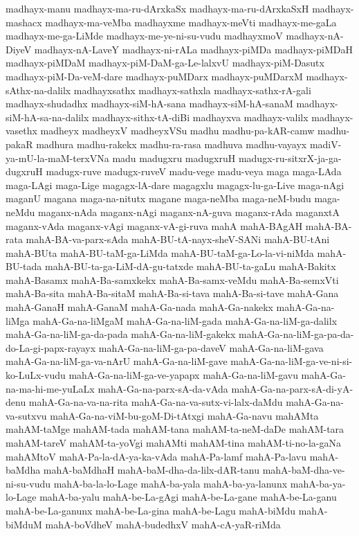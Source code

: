 {madhayx-manu
madhayx-ma-ru-dArxkaSx
madhayx-ma-ru-dArxkaSxH
madhayx-mashacx
madhayx-ma-veMba
madhayxme
madhayx-meVti
madhayx-me-gaLa
madhayx-me-ga-LiMde
madhayx-me-ye-ni-su-vudu
madhayxmoV
madhayx-nA-DiyeV
madhayx-nA-LaveY
madhayx-ni-rALa
madhayx-piMDa
madhayx-piMDaH
madhayx-piMDaM
madhayx-piM-DaM-ga-Le-lalxvU
madhayx-piM-Dasutx
madhayx-piM-Da-veM-dare
madhayx-puMDarx
madhayx-puMDarxM
madhayx-sAthx-na-dalilx
madhayxsathx
madhayx-sathxla
madhayx-sathx-rA-gali
madhayx-shudadhx
madhayx-siM-hA-sana
madhayx-siM-hA-sanaM
madhayx-siM-hA-sa-na-dalilx
madhayx-sithx-tA-diBi
madhayxva
madhayx-valilx
madhayx-vasethx
madheyx
madheyxV
madheyxVSu
madhu
madhu-pa-kAR-camw
madhu-pakaR
madhura
madhu-rakekx
madhu-ra-rasa
madhuva
madhu-vayayx
madiV-ya-mU-la-maM-terxVNa
madu
madugxru
madugxruH
madugx-ru-sitxrX-ja-ga-dugxruH
madugx-ruve
madugx-ruveV
madu-vege
madu-veya
maga
maga-LAda
maga-LAgi
maga-Lige
magagx-lA-dare
magagxlu
magagx-lu-ga-Live
maga-nAgi
maganU
magana
maga-na-nitutx
magane
maga-neMba
maga-neM-budu
maga-neMdu
maganx-nAda
maganx-nAgi
maganx-nA-guva
maganx-rAda
maganxtA
maganx-vAda
maganx-vAgi
maganx-vA-gi-ruva
mahA
mahA-BAgAH
mahA-BA-rata
mahA-BA-va-parx-sAda
mahA-BU-tA-nayx-sheV-SANi
mahA-BU-tAni
mahA-BUta
mahA-BU-taM-ga-LiMda
mahA-BU-taM-ga-Lo-la-vi-niMda
mahA-BU-tada
mahA-BU-ta-ga-LiM-dA-gu-tatxde
mahA-BU-ta-gaLu
mahA-Bakitx
mahA-Basamx
mahA-Ba-samxkekx
mahA-Ba-samx-veMdu
mahA-Ba-semxVti
mahA-Ba-sita
mahA-Ba-sitaM
mahA-Ba-si-tava
mahA-Ba-si-tave
mahA-Gana
mahA-GanaH
mahA-GanaM
mahA-Ga-nada
mahA-Ga-nakekx
mahA-Ga-na-liMga
mahA-Ga-na-liMgaM
mahA-Ga-na-liM-gada
mahA-Ga-na-liM-ga-dalilx
mahA-Ga-na-liM-ga-da-pada
mahA-Ga-na-liM-gakekx
mahA-Ga-na-liM-ga-pa-da-do-La-gi-papx-rayayx
mahA-Ga-na-liM-ga-pa-daveV
mahA-Ga-na-liM-gava
mahA-Ga-na-liM-ga-va-nArU
mahA-Ga-na-liM-gave
mahA-Ga-na-liM-ga-ve-ni-si-ko-LuLx-vudu
mahA-Ga-na-liM-ga-ve-yapapx
mahA-Ga-na-liM-gavu
mahA-Ga-na-ma-hi-me-yuLaLx
mahA-Ga-na-parx-sA-da-vAda
mahA-Ga-na-parx-sA-di-yA-denu
mahA-Ga-na-va-na-rita
mahA-Ga-na-va-sutx-vi-lalx-daMdu
mahA-Ga-na-va-sutxvu
mahA-Ga-na-viM-bu-goM-Di-tAtxgi
mahA-Ga-navu
mahAMta
mahAM-taMge
mahAM-tada
mahAM-tana
mahAM-ta-neM-daDe
mahAM-tara
mahAM-tareV
mahAM-ta-yoVgi
mahAMti
mahAM-tina
mahAM-ti-no-la-gaNa
mahAMtoV
mahA-Pa-la-dA-ya-ka-vAda
mahA-Pa-lamf
mahA-Pa-lavu
mahA-baMdha
mahA-baMdhaH
mahA-baM-dha-da-lilx-dAR-tanu
mahA-baM-dha-ve-ni-su-vudu
mahA-ba-la-lo-Lage
mahA-ba-yala
mahA-ba-ya-lanunx
mahA-ba-ya-lo-Lage
mahA-ba-yalu
mahA-be-La-gAgi
mahA-be-La-gane
mahA-be-La-ganu
mahA-be-La-ganunx
mahA-be-La-gina
mahA-be-Lagu
mahA-biMdu
mahA-biMduM
mahA-boVdheV
mahA-budedhxV
mahA-cA-yaR-riMda
}
